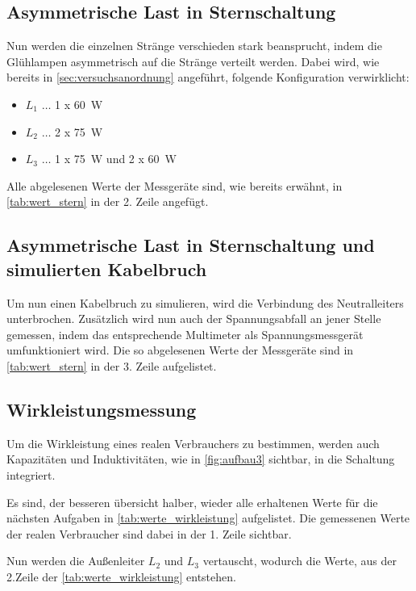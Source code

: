 \documentclass[12pt,english,ngerman]{scrartcl}
\begin{document}
\subsection{Asymmetrische Last in Sternschaltung}\label{sec:vers_asy_stern_ohne}

Nun werden die einzelnen Stränge verschieden stark beansprucht, indem die
Glühlampen asymmetrisch auf die Stränge verteilt werden. Dabei wird, wie
bereits in \autoref{sec:versuchsanordnung} angeführt, folgende Konfiguration
verwirklicht:

\begin{itemize}
	\item $L_1$ \(\dots\) 1 x \SI[]{60}{\watt}
	\item $L_2$ \(\dots\) 2 x \SI[]{75}{\watt}
	\item $L_3$ \(\dots\) 1 x \SI[]{75}{\watt} und 2 x \SI[]{60}{\watt}
\end{itemize}

Alle abgelesenen Werte der Messgeräte sind, wie bereits erwähnt, in
\autoref{tab:wert_stern} in der 2. Zeile angefügt.

\subsection{Asymmetrische Last in Sternschaltung und simulierten Kabelbruch}\label{sec:vers_asy_stern_mit}

Um nun einen Kabelbruch zu simulieren, wird die Verbindung des Neutralleiters
unterbrochen. Zusätzlich wird nun auch der Spannungsabfall an jener Stelle
gemessen, indem das entsprechende Multimeter als Spannungsmessgerät
umfunktioniert wird. Die so abgelesenen Werte der Messgeräte sind in
\autoref{tab:wert_stern} in der 3. Zeile aufgelistet.

\subsection{Wirkleistungsmessung}
Um die Wirkleistung eines realen Verbrauchers zu bestimmen, werden auch
Kapazitäten und Induktivitäten, wie in \autoref{fig:aufbau3} sichtbar, in die
Schaltung integriert.

Es sind, der besseren übersicht halber, wieder alle erhaltenen Werte für die
nächsten Aufgaben in \autoref{tab:werte_wirkleistung} aufgelistet. Die
gemessenen Werte der realen Verbraucher sind dabei in der 1. Zeile sichtbar.

Nun werden die Außenleiter $L_2$ und $L_3$ vertauscht, wodurch die Werte, aus
der 2.Zeile der \autoref{tab:werte_wirkleistung} entstehen.
\end{document}

